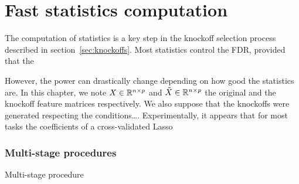 \chapter{Fast statistics computation}\label{ch:fsc}

The computation of statistics is a key step in the knockoff selection process described in section~\ref{sec:knockoffs}.
Most statistics control the FDR,
provided that the

However, the power can drastically change depending on how good the statistics are.
In this chapter, we note $X \in \mathbb{R}^{n \times p}$ and $\tilde{X} \in \mathbb{R}^{n \times p}$ the original and the knockoff
feature matrices respectively.
We also suppose that the knockoffs were generated respecting the conditions\dots.
Experimentally, it appears that for most tasks the coefficients of a cross-validated Lasso

\subsection{Multi-stage procedures}\label{subsec:multi_stage}

Multi-stage procedure~\cite{multi_stage_fdr}
